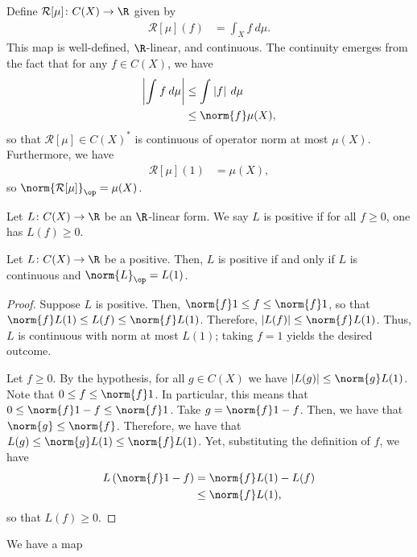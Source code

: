 \documentclass[10pt]{mypackage}
\begin{document}
Define $\mathcal{R}[\mu]\colon C(X)\to \R$ given by
\begin{align*}
  \mathcal{R}\left[ \mu \right](f) &= \int_{X}^{} f\:d\mu.
\end{align*}
This map is well-defined, $\R$-linear, and continuous. The continuity emerges from the fact that for any $f\in C(X)$, we have
\begin{align*}
  \left\vert \int_{}^{} f\:d\mu \right\vert &\leq \int_{}^{} \left\vert f \right\vert\:d\mu\\
                                                                 &\leq \norm{f}\mu(X),
\end{align*}
so that $\mathcal{R}\left[ \mu \right]\in C(X)^{\ast}$ is continuous of operator norm at most $\mu(X)$. Furthermore, we have
\begin{align*}
  \mathcal{R}\left[ \mu \right]\left( 1 \right) &= \mu(X),
\end{align*}
so $\norm{\mathcal{R}[\mu]}_{\op} = \mu(X)$.
\begin{definition}
  Let $L\colon C(X)\to \R$ be an $\R$-linear form. We say $L$ is positive if for all $f\geq 0$, one has $L(f)\geq 0$.
\end{definition}
\begin{proposition}
  Let $L\colon C(X)\to \R$ be a positive. Then, $L$ is positive if and only if $L$ is continuous and $\norm{L}_{\op} = L(1)$.
\end{proposition}
\begin{proof}
  Suppose $L$ is positive. Then, $\norm{f}1\leq f\leq \norm{f}1$, so that $\norm{f}L(1)\leq L(f)\leq \norm{f}L(1)$. Therefore, $\left\vert L(f) \right\vert\leq \norm{f}L(1)$. Thus, $L$ is continuous with norm at most $L(1)$; taking $f = 1$ yields the desired outcome.

  Let $f\geq 0$. By the hypothesis, for all $g\in C(X)$ we have $\left\vert L(g) \right\vert\leq \norm{g}L(1)$. Note that $0\leq f \leq \norm{f}1$. In particular, this means that $0\leq \norm{f}1 - f \leq \norm{f}1$. Take $g = \norm{f}1-f$. Then, we have that $\norm{g}\leq \norm{f}$. Therefore, we have that $L(g)\leq \norm{g}L(1)\leq \norm{f}L(1)$. Yet, substituting the definition of $f$, we have
  \begin{align*}
    L\left( \norm{f}1-f \right) &= \norm{f}L(1) - L(f)\\
                                &\leq \norm{f}L(1),
  \end{align*}
  so that $L(f)\geq 0$.
\end{proof}
We have a map
\end{document}
